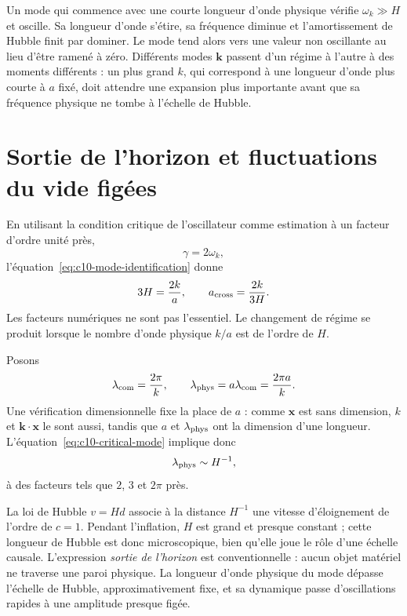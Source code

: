 Un mode qui commence avec une courte longueur d’onde physique vérifie \(\omega_k\gg H\) et oscille. Sa longueur d’onde s’étire, sa fréquence diminue et l’amortissement de Hubble finit par dominer. Le mode tend alors vers une valeur non oscillante au lieu d’être ramené à zéro. Différents modes \(\mathbf k\) passent d’un régime à l’autre à des moments différents : un plus grand \(k\), qui correspond à une longueur d’onde plus courte à \(a\) fixé, doit attendre une expansion plus importante avant que sa fréquence physique ne tombe à l’échelle de Hubble.

\section{Sortie de l’horizon et fluctuations du vide figées}

En utilisant la condition critique de l’oscillateur comme estimation à un facteur d’ordre unité près,
\[
\gamma=2\omega_k,
\]
l’équation~\eqref{eq:c10-mode-identification} donne
\begin{equation}
3H=\frac{2k}{a},
\qquad
a_{\rm cross}=\frac{2k}{3H}.
\label{eq:c10-critical-mode}
\end{equation}
Les facteurs numériques ne sont pas l’essentiel. Le changement de régime se produit lorsque le nombre d’onde physique \(k/a\) est de l’ordre de \(H\).

Posons
\[
\lambda_{\rm com}=\frac{2\pi}{k},
\qquad
\lambda_{\rm phys}=a\lambda_{\rm com}
=\frac{2\pi a}{k}.
\]
Une vérification dimensionnelle fixe la place de \(a\) : comme \(\mathbf x\) est sans dimension, \(k\) et \(\mathbf k\cdot\mathbf x\) le sont aussi, tandis que \(a\) et \(\lambda_{\rm phys}\) ont la dimension d’une longueur. L’équation~\eqref{eq:c10-critical-mode} implique donc
\begin{equation}
\lambda_{\rm phys}\sim H^{-1},
\label{eq:c10-horizon-crossing}
\end{equation}
à des facteurs tels que \(2\), \(3\) et \(2\pi\) près.

La loi de Hubble \(v=Hd\) associe à la distance \(H^{-1}\) une vitesse d’éloignement de l’ordre de \(c=1\). Pendant l’inflation, \(H\) est grand et presque constant ; cette longueur de Hubble est donc microscopique, bien qu’elle joue le rôle d’une échelle causale. L’expression \emph{sortie de l’horizon} est conventionnelle : aucun objet matériel ne traverse une paroi physique. La longueur d’onde physique du mode dépasse l’échelle de Hubble, approximativement fixe, et sa dynamique passe d’oscillations rapides à une amplitude presque figée.

